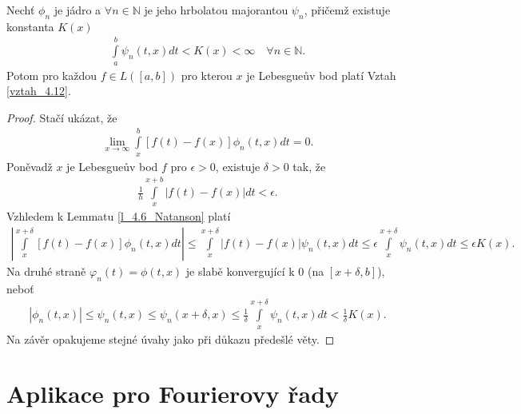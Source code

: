 \begin{theorem}[Fadeev]\label{v_4.10_Fadeev}
Nechť $\phi_n$ je jádro a $\forall n\in \mathbb{N}$ je jeho hrbolatou majorantou $\psi_n$, přičemž existuje konstanta $K(x)$
\begin{align*}
\int \limits_a^b \psi_n (t,x) dt < K(x) < \infty \quad \forall n \in \mathbb{N}.
\end{align*}
Potom pro každou $f \in L([a,b])$ pro kterou $x$ je Lebesgueův bod platí Vztah \eqref{vztah_4.12}.
\begin{proof}
Stačí ukázat, že
\begin{align*}
\lim_{x \rightarrow \infty} \int \limits_x^b [f(t) - f(x)] \phi_n (t,x) dt = 0.
\end{align*}
Poněvadž $x$ je Lebesgueův bod $f$ pro $\epsilon > 0$, existuje $\delta > 0$ tak, že
\begin{align*}
\frac{1}{h} \int \limits_x^{x+b} |f(t) - f(x)| dt < \epsilon.
\end{align*}
Vzhledem k Lemmatu \ref{l_4.6_Natanson} platí
\begin{align*}
\left| \int \limits_x^{x+\delta} [f(t) - f(x)] \phi_n(t,x) dt \right| \leq \int \limits_x^{x + \delta} |f(t) - f(x)| \psi_n (t,x) dt \leq \epsilon \int \limits_x^{x + \delta} \psi_n (t,x) dt \leq \epsilon K(x).
\end{align*}
Na druhé straně $\varphi_n (t) = \phi (t,x)$ je slabě konvergující k $0$ (na $[x + \delta, b]$), neboť
\begin{align*}
|\phi_n (t,x)| \leq \psi_n (t,x) \leq \psi_n (x + \delta, x) \leq \frac{1}{\delta} \int \limits_x^{x+\delta} \psi_n (t,x) dt < \frac{1}{\delta} K(x).
\end{align*}
Na závěr opakujeme stejné úvahy jako při důkazu předešlé věty.
\end{proof} 
\end{theorem}




\section{Aplikace pro Fourierovy řady}

